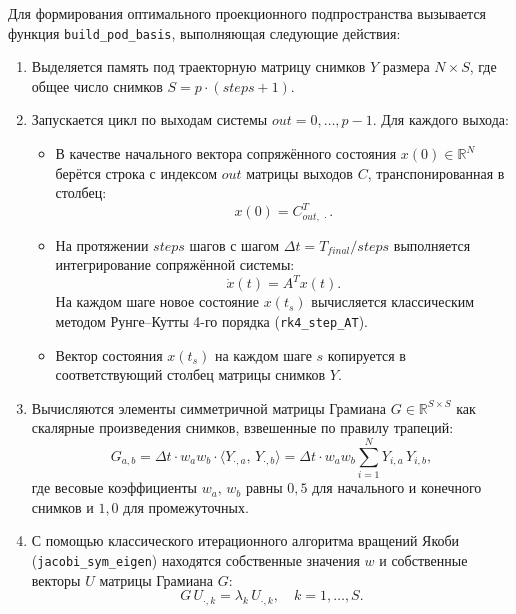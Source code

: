 \documentclass[12pt, a4paper, oneside]{extarticle}
\begin{document}
Для формирования оптимального проекционного подпространства вызывается функция
\texttt{build\_pod\_basis}, выполняющая следующие действия:
\begin{enumerate}
    \item Выделяется память под траекторную матрицу снимков $Y$ размера
    $N \times S$, где общее число снимков $S = p \cdot (steps + 1)$.

    \item Запускается цикл по выходам системы $out = 0, \dots, p-1$. Для
    каждого выхода:
    \begin{itemize}
        \item В качестве начального вектора сопряжённого состояния
        $x(0) \in \mathbb{R}^N$ берётся строка с индексом $out$ матрицы
        выходов $C$, транспонированная в столбец:
        \begin{equation*}
            x(0) = C_{out,\,\cdot}^T.
        \end{equation*}
        \item На протяжении $steps$ шагов с шагом $\Delta t = T_{final}/steps$
        выполняется интегрирование сопряжённой системы:
        \begin{equation*}
            \dot{x}(t) = A^T x(t).
        \end{equation*}
        На каждом шаге новое состояние $x(t_s)$ вычисляется классическим
        методом Рунге--Кутты 4-го порядка (\texttt{rk4\_step\_AT}).
        \item Вектор состояния $x(t_s)$ на каждом шаге $s$ копируется в
        соответствующий столбец матрицы снимков $Y$.
    \end{itemize}

    \item Вычисляются элементы симметричной матрицы Грамиана
    $G \in \mathbb{R}^{S \times S}$ как скалярные произведения снимков,
    взвешенные по правилу трапеций:
    \begin{equation*}
        G_{a,b} = \Delta t \cdot w_a w_b \cdot \langle Y_{\cdot,a},\,
        Y_{\cdot,b}\rangle = \Delta t \cdot w_a w_b \sum_{i=1}^N Y_{i,a}\,Y_{i,b},
    \end{equation*}
    где весовые коэффициенты $w_a,\,w_b$ равны $0{,}5$ для начального и
    конечного снимков и $1{,}0$ для промежуточных.

    \item С помощью классического итерационного алгоритма вращений Якоби
    (\texttt{jacobi\_sym\_eigen}) находятся собственные значения $w$ и
    собственные векторы $U$ матрицы Грамиана $G$:
    \begin{equation*}
        G\,U_{\cdot,k} = \lambda_k\,U_{\cdot,k}, \quad k = 1, \dots, S.
    \end{equation*}


\end{enumerate}
\end{document}
